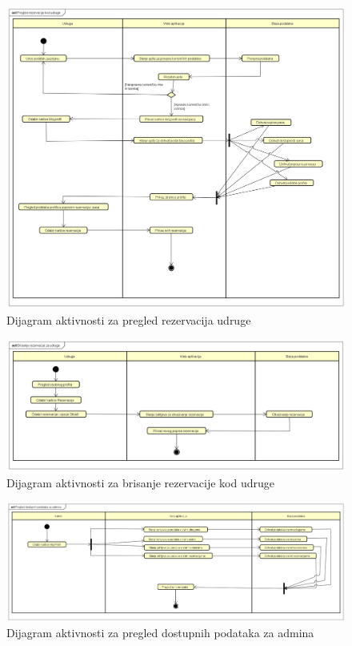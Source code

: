 		\begin{figure}[H]
			\includegraphics[scale=0.4]{dijagrami/Pregled_rezervacija_kod_udruge.png}
			\centering
			\caption{Dijagram aktivnosti za pregled rezervacija udruge}
			\label{fig:activity_diagram_10}
		\end{figure}

		\begin{figure}[H]
			\includegraphics[scale=0.4]{dijagrami/Brisanje_rezervacije_za_udruge.png}
			\centering
			\caption{Dijagram aktivnosti za brisanje rezervacije kod udruge}
			\label{fig:activity_diagram_11}
		\end{figure}

		\begin{figure}[H]
			\includegraphics[scale=0.3]{dijagrami/Pregled_dostupnih_podataka_za_admina.png}
			\centering
			\caption{Dijagram aktivnosti za pregled dostupnih podataka za admina}
			\label{fig:activity_diagram_12}
		\end{figure}
			
